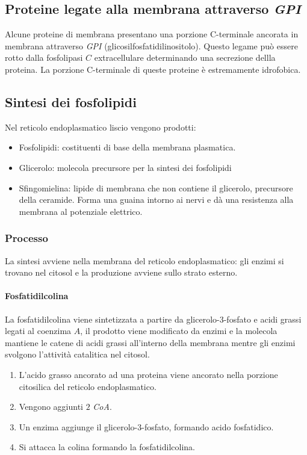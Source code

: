 	\subsection{Proteine legate alla membrana attraverso \emph{GPI}}
	Alcune proteine di membrana presentano una porzione C-terminale ancorata in membrana attraverso \emph{GPI} (glicosilfosfatidilinositolo).
	Questo legame pu\`o essere rotto dalla fosfolipasi $C$ extracellulare determinando una secrezione dellla proteina.
	La porzione C-terminale di queste proteine \`e estremamente idrofobica.

	\subsection{Sintesi dei fosfolipidi}
	Nel reticolo endoplasmatico liscio vengono prodotti:
	\begin{multicols}{2}
		\begin{itemize}
			\item Fosfolipidi: costituenti di base della membrana plasmatica.
			\item Glicerolo: molecola precursore per la sintesi dei fosfolipidi
			\item Sfingomielina: lipide di membrana che non contiene il glicerolo, precursore della ceramide.
				Forma una guaina intorno ai nervi e d\`a una resistenza alla membrana al potenziale elettrico.
		\end{itemize}
	\end{multicols}

		\subsubsection{Processo}
		La sintesi avviene nella membrana del reticolo endoplasmatico: gli enzimi si trovano nel citosol e la produzione avviene sullo strato esterno.

			\paragraph{Fosfatidilcolina}
			La fosfatidilcolina viene sintetizzata a partire da glicerolo-3-fosfato e acidi grassi legati al coenzima $A$, il prodotto viene modificato da enzimi e la molecola mantiene le catene di acidi grassi all'interno della membrana mentre gli enzimi svolgono l'attivit\`a catalitica nel citosol.
			\begin{multicols}{2}
				\begin{enumerate}
					\item L'acido grasso ancorato ad una proteina viene ancorato nella porzione citosilica del reticolo endoplasmatico.
					\item Vengono aggiunti $2$ \emph{CoA}.
					\item Un enzima aggiunge il glicerolo-3-fosfato, formando acido fosfatidico.
					\item Si attacca la colina formando la fosfatidilcolina.
				\end{enumerate}
			\end{multicols}


